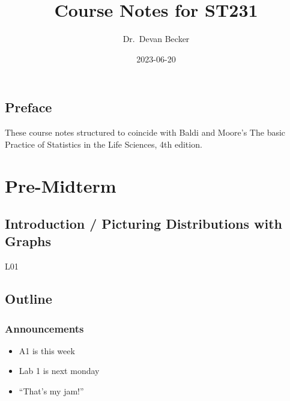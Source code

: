 \documentclass[
  letterpaper,
  DIV=11,
  numbers=noendperiod]{scrreprt}
\title{Course Notes for ST231}
\author{Dr.~Devan Becker}
\date{2023-06-20}
\providecommand{\tightlist}{%
  \setlength{\itemsep}{0pt}\setlength{\parskip}{0pt}}\usepackage{longtable,booktabs,array}
\renewcommand*\contentsname{Table of contents}
\newcommand\contentsname{Table of contents}
\begin{document}
\maketitle
\ifdefined\Shaded\renewenvironment{Shaded}{\begin{tcolorbox}[sharp corners, enhanced, borderline west={3pt}{0pt}{shadecolor}, boxrule=0pt, interior hidden, frame hidden, breakable]}{\end{tcolorbox}}\fi

\renewcommand*\contentsname{Table of contents}
{
\hypersetup{linkcolor=}
\setcounter{tocdepth}{2}
\tableofcontents
}

\hypertarget{preface}{%
\chapter*{Preface}\label{preface}}


These course notes structured to coincide with Baldi and Moore's The
basic Practice of Statistics in the Life Sciences, 4th edition.

\part{Pre-Midterm}

\hypertarget{introduction-picturing-distributions-with-graphs}{%
\chapter{Introduction / Picturing Distributions with
Graphs}\label{introduction-picturing-distributions-with-graphs}}

L01

\hfill\break

\hypertarget{outline}{%
\chapter{Outline}\label{outline}}

\hypertarget{announcements}{%
\section{Announcements}\label{announcements}}

\begin{itemize}
\tightlist
\item
  A1 is this week\lspace
\item
  Lab 1 is next monday\lspace
\item
  ``That's my jam!''\lspace
\end{itemize}
\end{document}
